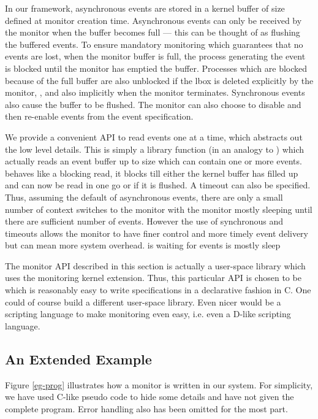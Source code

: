 In our framework, asynchronous events are stored in a kernel buffer
of size  defined at monitor creation time. Asynchronous events
can only be received by the monitor when the buffer becomes full --- this
can be thought of as flushing the buffered events.
To ensure mandatory monitoring which guarantees that no events are lost, 
when the monitor buffer is full, the process generating the event 
is blocked until the monitor has emptied the buffer.
Processes which are blocked because of the full buffer are also unblocked
if the lbox is deleted explicitly by the monitor, ,
and also implicitly when the monitor terminates.
Synchronous events also cause the buffer to be flushed.
The monitor can also choose to disable and then re-enable events from
the event specification. 

We provide a convenient API to read events one at a time,
 which abstracts out the low level details.
This is simply a library function (in an analogy to ) which
actually reads an event buffer up to size  which can
contain one or more events. 
 behaves like a blocking read, it blocks
till either the kernel buffer has filled up and can now be read
in one go or if it is flushed. A timeout can also be specified.
Thus, assuming the default of asynchronous events, there are only a small
number of context switches to the monitor with the monitor mostly sleeping
until there are sufficient number of events. However the use of synchronous
and timeouts allows the monitor to have finer control and more timely
event delivery but can mean more system overhead.
is waiting for events is mostly sleep

The monitor API described in this section is actually a user-space library
which uses the monitoring kernel extension. Thus, this particular
API is chosen to be which is reasonably easy to write specifications
in a declarative fashion in C.
One could of course build a different user-space library.
Even nicer would be a scripting language to make monitoring even easy,
i.e. even a D-like scripting language.

\subsection{An Extended Example}
\label{sec-eg}

Figure \ref{eg-prog} illustrates how a monitor is written in our system.
For simplicity, we have used C-like pseudo code to
hide some details and have not given the complete program.
Error handling also has been omitted for the most part.


